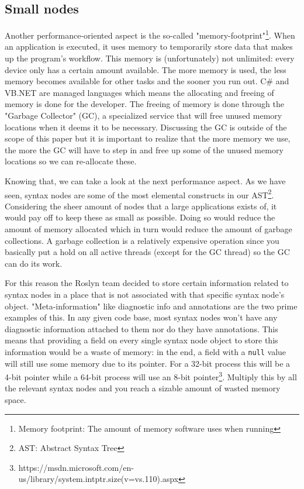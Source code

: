 \subsection{Small nodes}
\label{sec:small-nodes}

Another performance-oriented aspect is the so-called "memory-footprint"\footnote{Memory footprint: The amount of memory software uses when running}. When an application is executed, it uses memory to temporarily store data that makes up the program's workflow. This memory is (unfortunately) not unlimited: every device only has a certain amount available. The more memory is used, the less memory becomes available for other tasks and the sooner you run out. C\# and VB.NET are managed languages which means the allocating and freeing of memory is done for the developer. The freeing of memory is done through the "Garbage Collector" (GC), a specialized service that will free unused memory locations when it deems it to be necessary. Discussing the GC is outside of the scope of this paper but it is important to realize that the more memory we use, the more the GC will have to step in and free up some of the unused memory locations so we can re-allocate these.\parencite{Todorov2013}

Knowing that, we can take a look at the next performance aspect. As we have seen, syntax nodes are some of the most elemental constructs in our AST\footnote{AST: Abstract Syntax Tree}. Considering the sheer amount of nodes that a large applications exists of, it would pay off to keep these as small as possible. Doing so would reduce the amount of memory allocated which in turn would reduce the amount of garbage collections. A garbage collection is a relatively expensive operation since you basically put a hold on all active threads (except for the GC thread) so the GC can do its work.\parencite{Botelho2014}

For this reason the Roslyn team decided to store certain information related to syntax nodes in a place that is not associated with that specific syntax node's object.\parencite{Sadov2014} "Meta-information" like diagnostic info and annotations are the two prime examples of this. In any given code base, most syntax nodes won't have any diagnostic information attached to them nor do they have annotations. This means that providing a field on every single syntax node object to store this information would be a waste of memory: in the end, a field with a \texttt{null} value will still use some memory due to its pointer. For a 32-bit process this will be a 4-bit pointer while a 64-bit process will use an 8-bit pointer\footnote{https://msdn.microsoft.com/en-us/library/system.intptr.size(v=vs.110).aspx}. Multiply this by all the relevant syntax nodes and you reach a sizable amount of wasted memory space.

